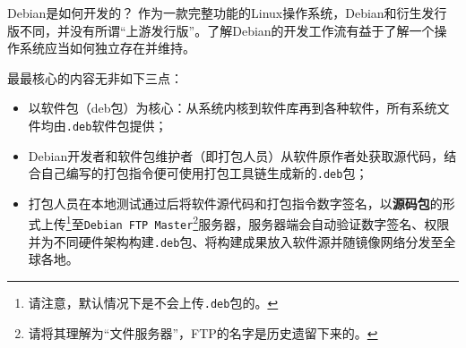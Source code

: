 
\begin{frame}{Debian是如何开发的？}
	作为一款完整功能的Linux操作系统，Debian和衍生发行版不同，并没有所谓“上游发行版”。了解Debian的开发工作流有益于了解一个操作系统应当如何独立存在并维持。
	
	\vfill
	
	最最核心的内容无非如下三点：
	
	\begin{itemize}
		\item 以软件包（deb包）为核心：从系统内核到软件库再到各种软件，所有系统文件均由\texttt{.deb}软件包提供；
		\item Debian开发者和软件包维护者（即打包人员）从软件原作者处获取源代码，结合自己编写的打包指令便可使用打包工具链生成新的\texttt{.deb}包；
		\item 打包人员在本地测试通过后将软件源代码和打包指令数字签名，以\textbf{源码包}的形式上传\footnote{请注意，默认情况下是不会上传\texttt{.deb}包的。}至\texttt{Debian FTP Master}\footnote{请将其理解为“文件服务器”，FTP的名字是历史遗留下来的。}服务器，服务器端会自动验证数字签名、权限并为不同硬件架构构建\texttt{.deb}包、将构建成果放入软件源并随镜像网络分发至全球各地。
	\end{itemize}
	
\end{frame}